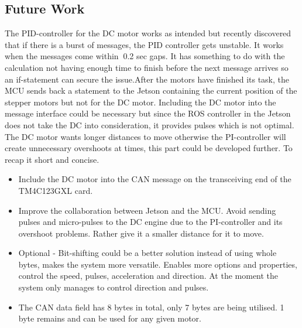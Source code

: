 \subsection{Future Work} 
The PID-controller for the DC motor works as intended but recently discovered that if there is a burst of messages, the PID controller gets unstable. It works when the messages come within $~$0.2 sec gaps. It has something to do with the calculation not having enough time to finish before the next message arrives so an if-statement can secure the issue.\newline After the motors have finished its task, the MCU sends back a statement to the Jetson containing the current position of the stepper motors but not for the DC motor. Including the DC motor into the message interface could be necessary but since the ROS controller in the Jetson does not take the DC into consideration, it provides pulses which is not optimal. The DC motor wants longer distances to move otherwise the PI-controller will create unnecessary overshoots at times, this part could be developed further. To recap it short and concise.
\begin{itemize}
  \item Include the DC motor into the CAN message on the transceiving end of the TM4C123GXL card.
  \item Improve the collaboration between Jetson and the MCU. Avoid sending pulses and micro-pulses to the DC engine due to the PI-controller and its overshoot problems. Rather give it a smaller distance for it to move. 
  \item Optional - Bit-shifting could be a better solution instead of using whole bytes, makes the system more versatile. Enables more options and properties, control the speed, pulses, acceleration and direction. At the moment the system only manages to control direction and pulses.
  \item The CAN data field has 8 bytes in total, only 7 bytes are being utilised. 1 byte remains and can be used for any given motor. 
\end{itemize}


